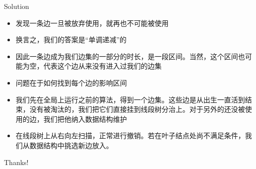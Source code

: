 ﻿\documentclass[aspectratio=169,handout]{ctexbeamer}
\begin{document}
\begin{frame}{Solution}
    \begin{itemize}
        \item 发现一条边一旦被放弃使用，就再也不可能被使用
        \item 换言之，我们的答案是“单调递减”的
        \item 因此一条边成为我们边集的一部分的时长，是一段区间。当然，这个区间也可能为空，代表这个边从来没有进入过我们的边集
        \item 问题在于如何找到每个边的影响区间
        \item 我们先在全局上运行之前的算法，得到一个边集。这些边是从出生一直活到结束，没有被淘汰的，我们把它们直接挂到线段树分治上。对于另外的还没被使用的边，我们把他纳入数据结构维护
        \item 在线段树上从右向左扫描，正常进行撤销。若在叶子结点处尚不满足条件，我们从数据结构中挑选新边放入。
    \end{itemize}
\end{frame}





\begin{frame}
    \begin{center}
        {\Huge\calligra Thanks!}
    \end{center}
\end{frame}
\end{document}
